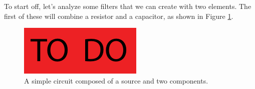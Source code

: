 To start off, let's analyze some filters that we can create with two elements.  The first of these will combine a resistor and a capacitor, as shown in Figure \ref{fig:RC_highpass}.

\begin{figure}
   \centering
  \includegraphics{figures/toDo}
  \caption{A simple circuit composed of a source and two components.}
  \label{fig:RC_highpass}
\end{figure}
